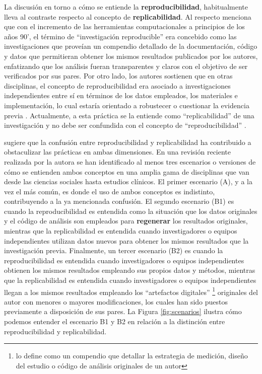 \documentclass[
]{book}
\begin{document}
La discusión en torno a cómo se entiende la \textbf{reproducibilidad}, habitualmente lleva al contraste respecto al concepto de \textbf{replicabilidad}. Al respecto \citet{earth_Reproducibility_2019} menciona que con el incremento de las herramientas computacionales a principios de los años 90', el término de ``investigación reproducible'' era concebido como las investigaciones que proveían un compendio detallado de la documentación, código y datos que permitieran obtener los mismos resultados publicados por los autores, enfatizando que los análisis fueran transparentes y claros con el objetivo de ser verificados por sus pares. Por otro lado, los autores sostienen que en otras disciplinas, el concepto de reproducibilidad era asociado a investigaciones independientes entre sí en términos de los datos empleados, los materiales e implementación, lo cual estaría orientado a robustecer o cuestionar la evidencia previa \citep[pp 33-34]{earth_Reproducibility_2019}. Actualmente, a esta práctica se la entiende como ``replicabilidad'' de una investigación y no debe ser confundida con el concepto de ``reproducibilidad'' \citep{barba_Terminologies_2018}.

\citet{barba_Terminologies_2018} sugiere que la confusión entre reproducibilidad y replicabilidad ha contribuido a obstaculizar las prácticas en ambas dimensiones. En una revisión reciente realizada por la autora se han identificado al menos tres escenarios o versiones de cómo se entienden ambos conceptos en una amplia gama de disciplinas que van desde las ciencias sociales hasta estudios clínicos. El primer escenario (A), y a la vez el más común, es donde el uso de ambos conceptos es indistinto, contribuyendo a la ya mencionada confusión. El segundo escenario (B1) es cuando la reproducibilidad es entendida como la situación que los datos originales y el código de análisis son empleados para \textbf{regenerar} los resultados originales, mientras que la replicabilidad es entendida cuando investigadores o equipos independientes utilizan datos nuevos para obtener los mismos resultados que la investigación previa. Finalmente, un tercer escenario (B2) es cuando la reproducibilidad es entendida cuando investigadores o equipos independientes obtienen los mismos resultados empleando sus propios datos y métodos, mientras que la replicabilidad es entendida cuando investigadores o equipos independientes llegan a los mismos resultados empleando los ``artefactos digitales'' \footnote{\citet{barba_Terminologies_2018} lo define como un compendio que detallar la estrategia de medición, diseño del estudio o código de análisis originales de un autor} originales del autor con menores o mayores modificaciones, los cuales han sido puestos previamente a disposición de sus pares. La Figura \ref{fig:scenarios} ilustra cómo podemos entender el escenario B1 y B2 en relación a la distinción entre reproducibilidad y replicabilidad.
\end{document}
